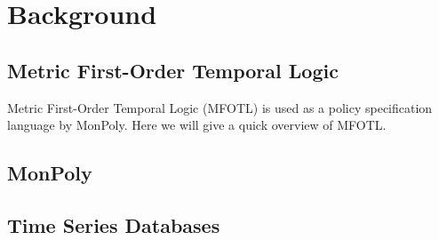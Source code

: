 \section{Background}

\subsection{Metric First-Order Temporal Logic}
Metric First-Order Temporal Logic (MFOTL) \cite{Basin2008, Basin2015, Chomicki1995} is used as a policy specification language by MonPoly.
Here we will give a quick overview of MFOTL.


\subsection{MonPoly}


\subsection{Time Series Databases}